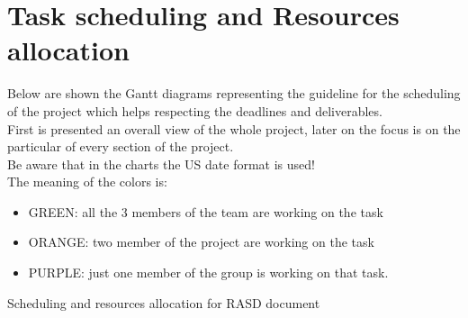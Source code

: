 \documentclass[a4paper,11pt]{report} %
\begin{document}
	\section{Task scheduling and Resources allocation}	
		Below are shown the Gantt diagrams representing the guideline for the scheduling of the project which helps respecting the deadlines and deliverables.\\
		First is presented an overall view of the whole project, later on the focus is on the particular of every section of the project.\\
		Be aware that in the charts the US date format is used!\smallskip\\
		The meaning of the colors is:
		\begin{itemize}
			\item GREEN: all the 3 members of the team are working on the task
			\item ORANGE: two member of the project are working on the task
			\item PURPLE: just one member of the group is working on that task.
		\end{itemize}
		\begin{minipage}{\linewidth}
		\end{minipage}			
		\begin{center}
			Scheduling and resources allocation for RASD document
		\end{center}		
		\begin{minipage}{\linewidth}
		\end{minipage}
\end{document}
